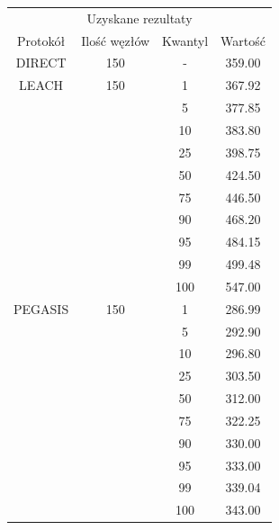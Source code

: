 \documentclass[a4paper,12pt,twoside,openany]{report}
\begin{document}
\begin{longtable}{*{4}{c}}
\toprule
\multicolumn{4}{c}{Uzyskane rezultaty} \\
Protokół	& Ilość węzłów	& Kwantyl	& Wartość \\
\midrule
\endhead
DIRECT	& 150 	& -	& 359.00 \\*
\midrule
LEACH	& 150	& 1	& 367.92 \\*
	&	& 5	& 377.85 \\*
	&	& 10	& 383.80 \\*
	&	& 25	& 398.75 \\*
	&	& 50	& 424.50 \\*
	&	& 75	& 446.50 \\*
	&	& 90	& 468.20 \\*
	&	& 95	& 484.15 \\*
	&	& 99	& 499.48 \\*
	&	& 100	& 547.00 \\*
\midrule
PEGASIS	& 150	& 1	& 286.99 \\*
	&	& 5	& 292.90 \\*
	&	& 10	& 296.80 \\*
	&	& 25	& 303.50 \\*
	&	& 50	& 312.00 \\*
	&	& 75	& 322.25 \\*
	&	& 90	& 330.00 \\*
	&	& 95	& 333.00 \\*
	&	& 99	& 339.04 \\*
	&	& 100	& 343.00 \\*
\bottomrule
\end{longtable}
\end{document}
